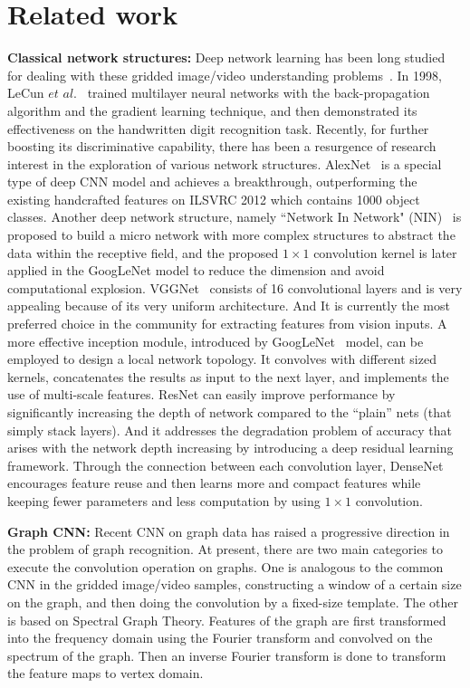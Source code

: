 \documentclass[journal]{IEEEtran}
\begin{document}
\section{Related work}
\label{sec:relatedwork}
\textbf{Classical network structures:}
Deep network learning has been long studied for dealing with these gridded image/video understanding problems~\cite{pr2017facial, pr2016survey, simonyan2014two, pr2018dvideo}. In 1998, LeCun $\textit{et al.}$~\cite{Lecun98} trained multilayer neural networks with the back-propagation algorithm and the gradient learning technique, and then demonstrated its effectiveness on the handwritten digit recognition task. Recently, for further boosting its discriminative capability, there has been a resurgence of research interest in the exploration of various network structures.
AlexNet~\cite{alexnet} is a special type of deep CNN model and achieves a breakthrough, outperforming the existing handcrafted features on ILSVRC 2012 which contains 1000 object classes.
Another deep network structure, namely ``Network In Network" (NIN)~\cite{NIN} is proposed to build a micro network with more complex structures to abstract the data within the receptive field, and the proposed $1 \times 1$ convolution kernel is later applied in the GoogLeNet model to reduce the dimension and avoid computational explosion.
VGGNet~\cite{vgg} consists of 16 convolutional layers and is very appealing because of its very uniform architecture. And It is currently the most preferred choice in the community for extracting features from vision inputs.
A more effective inception module, introduced by GoogLeNet~\cite{googleLeNet} model, can be employed to design a local network topology. It convolves with different sized kernels, concatenates the results as input to the next layer, and implements the use of multi-scale features.
ResNet \cite{resnet} can easily improve performance by significantly increasing the depth of network compared to the “plain” nets (that simply stack layers). And it addresses the degradation problem \cite{7299173, HighwayNetworks} of accuracy  that arises with the network depth increasing by introducing a deep residual learning framework.
Through the connection between each convolution layer, DenseNet \cite{densenet} encourages feature reuse and then learns more and compact features while keeping fewer parameters and less computation by using $1 \times 1$ convolution.





\textbf{Graph CNN:}
Recent CNN on graph data has raised a progressive direction in the problem of graph recognition. At present, there are two main categories to execute the convolution operation on graphs. One is analogous to the common CNN in the gridded image/video samples, constructing a window of a certain size on the graph, and then doing the convolution by a fixed-size template. The other is based on Spectral Graph Theory\cite{chung1997spectral}. Features of the graph are first transformed into the frequency domain using the Fourier transform and convolved on the spectrum of the graph. Then  an inverse Fourier transform is done to transform the feature maps to vertex domain.
\end{document}
